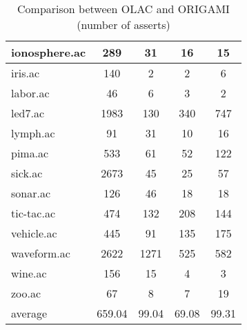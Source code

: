 \begin{table}[htbp]
\begin{tabular}{|l|c|c|c|c|}
		\hline
		ionosphere.ac   & 289           & 31                 & 16                       & 15                            \\
		\hline
		iris.ac         & 140           & 2                  & 2                        & 6                             \\
		\hline
		labor.ac        & 46            & 6                  & 3                        & 2                             \\
		\hline
		led7.ac         & 1983          & 130                & 340                      & 747                           \\
		\hline
		lymph.ac        & 91            & 31                 & 10                       & 16                            \\
		\hline
		pima.ac         & 533           & 61                 & 52                       & 122                           \\
		\hline
		sick.ac         & 2673          & 45                 & 25                       & 57                            \\
		\hline
		sonar.ac        & 126           & 46                 & 18                       & 18                            \\
		\hline
		tic-tac.ac      & 474           & 132                & 208                      & 144                           \\
		\hline
		vehicle.ac      & 445           & 91                 & 135                      & 175                           \\
		\hline
		waveform.ac     & 2622          & 1271               & 525                      & 582                           \\
		\hline
		wine.ac         & 156           & 15                 & 4                        & 3                             \\
		\hline
		zoo.ac          & 67            & 8                  & 7                        & 19                            \\
		\hline
		average         & 659.04        & 99.04              & 69.08                    & 99.31                         \\
		\hline
		\end{tabular}
	\caption{Comparison between OLAC and ORIGAMI (number of asserts)}
	\label{tab:comparison_olac_origami}
\end{table}